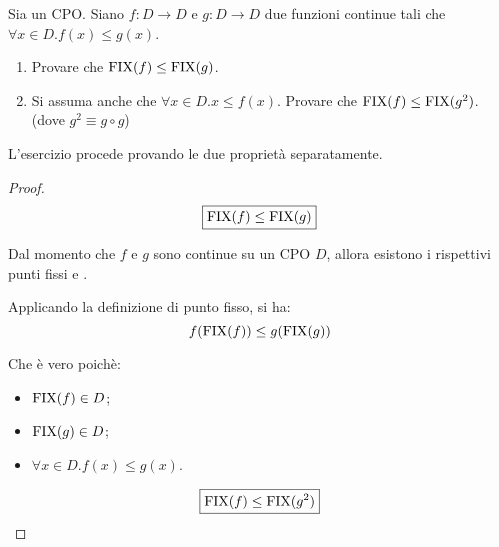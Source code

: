 {
  Sia  un CPO. Siano $f: D \to D$ e $g: D \to D$ due funzioni
  continue tali che $\forall{x}\in D. f(x) \leq{} g(x)$.
  \begin{enumerate}
    \item Provare che $\textrm{\normalfont{FIX}}(f) \leq{} \textrm{\normalfont{FIX}}(g)$.
    \item Si assuma anche che $\forall{x}\in D.x \leq{} f(x)$. Provare che
      $\textrm{\normalfont{FIX}}(f) \leq \textrm{\normalfont{FIX}}(g^2)$. (dove $g^2 \equiv{} g \circ g$)
  \end{enumerate}
}
{}
L'esercizio procede provando le due proprietà separatamente.

\begin{proof}
$$
\boxed{\textrm{\normalfont{FIX}}(f) \leq{} \textrm{\normalfont{FIX}}(g)}
$$

Dal momento che $f$ e $g$ sono continue su un CPO $D$, allora esistono i
rispettivi punti fissi  e .

Applicando la definizione di punto fisso, si ha:
\begin{equation}
  f(\textrm{\normalfont{FIX}}(f)) \leq{} g(\textrm{\normalfont{FIX}}(g))
\end{equation}

Che è vero poichè:
\begin{itemize}
  \item $\textrm{\normalfont{FIX}}(f) \in D$;
  \item $\textrm{\normalfont{FIX}}(g) \in D$;
  \item $\forall{x}\in D. f(x) \leq{} g(x)$.
\end{itemize}

$$
\boxed{\textrm{\normalfont{FIX}}(f) \leq \textrm{\normalfont{FIX}}(g^2)}
$$

\end{proof}
